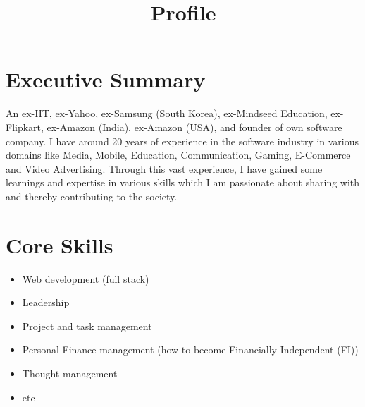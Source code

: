 \documentclass[11pt,a4paper,sans]{moderncv} %
\title{Profile}
\begin{document}
\makecvtitle %

\section{Executive Summary}
An ex-IIT, ex-Yahoo, ex-Samsung (South Korea), ex-Mindseed Education, ex-Flipkart, ex-Amazon (India), ex-Amazon (USA), and founder of own software company. I have around 20 years of experience in the software industry in various domains like Media, Mobile, Education, Communication, Gaming, E-Commerce and Video Advertising. Through this vast experience, I have gained some learnings and expertise in various skills which I am passionate about sharing with and thereby contributing to the society.

\section{Core Skills}
  \begin{itemize}
    \item Web development (full stack)
    \item Leadership
    \item Project and task management
    \item Personal Finance management (how to become Financially Independent (FI))
    \item Thought management
    \item etc
  \end{itemize}

\end{document}
